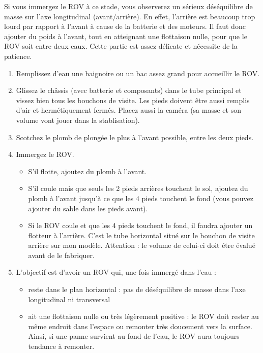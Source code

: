 \documentclass[11pt,a4paper]{article}
\begin{document}
      Si vous immergez le ROV à ce stade, vous observerez un sérieux déséquilibre de masse sur l'axe longitudinal (avant/arrière). En effet, l'arrière est  beaucoup trop lourd par rapport à l'avant à cause de la batterie et des moteurs. Il faut donc ajouter du poids à l'avant, tout en atteignant une flottaison nulle, pour que le ROV soit entre deux eaux. Cette partie est assez délicate et nécessite de la patience.
      \begin{enumerate}
        \item Remplissez d'eau une baignoire ou un bac assez grand pour accueillir le ROV.
        \item Glissez le châssis (avec batterie et composants) dans le tube principal et vissez bien tous les bouchons de visite. Les pieds doivent être aussi remplis d'air et hermétiquement fermés. Placez aussi la caméra (sa masse et son volume vont jouer dans la stablisation).
        \item Scotchez le plomb de plongée le plus à l'avant possible, entre les deux pieds.
        \item Immergez le ROV. 
        \begin{itemize}
          \item S'il flotte, ajoutez du plomb à l'avant.
          \item S'il coule mais que seuls les 2 pieds arrières touchent le sol, ajoutez du plomb à l'avant jusqu'à ce que les 4 pieds touchent le fond (vous pouvez ajouter du sable dans les pieds avant).
          \item Si le ROV coule et que les 4 pieds touchent le fond, il faudra ajouter un flotteur à l'arrière. C'est le tube horizontal situé sur le bouchon de visite arrière sur mon modèle. Attention : le volume de celui-ci doit être évalué avant de le fabriquer.
        \end{itemize}
        \item L'objectif est d'avoir un ROV qui, une fois immergé dans l'eau :
        \begin{itemize}
          \item reste dans le plan horizontal : pas de déséquilibre de masse dans l'axe longitudinal ni transversal
          \item ait une flottaison nulle ou très légèrement positive : le ROV doit rester au même endroit dans l'espace ou remonter très doucement vers la surface. Ainsi, si une panne survient au fond de l'eau, le ROV aura toujours tendance à remonter.
        \end{itemize}
      \end{enumerate}
\end{document}
